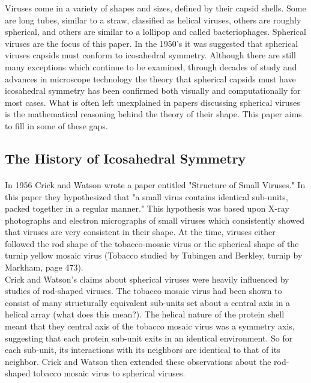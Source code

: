 \documentclass[12pt,letter]{article}
\begin{document}
Viruses come in a variety of shapes and sizes, defined by their capsid shells. Some are long tubes, similar to a straw, classified as helical viruses, others are roughly spherical, and others are similar to a lollipop and called bacteriophages. Spherical viruses are the focus of this paper. In the 1950's it was suggested that spherical viruses capsids must conform to icosahedral symmetry. Although there are still many exceptions which continue to be examined, through decades of study and advances in microscope technology the theory that spherical capsids must have icosahedral symmetry has been confirmed both visually and computationally for most cases. What is often left unexplained in papers discussing spherical viruses is the mathematical reasoning behind the theory of their shape. This paper aims to fill in some of these gaps.

\subsection{The History of Icosahedral Symmetry} %

\paragraph{}
In 1956 Crick and Watson wrote a paper entitled "Structure of Small Viruses." In this paper they hypothesized that "a small virus contains identical sub-units, packed together in a regular manner." This hypothesis was based upon X-ray photographs and electron micrographs of small viruses which consistently showed that viruses are very consistent in their shape. At the time, viruses either followed the rod shape of the tobacco-mosaic virus or the spherical shape of the turnip yellow mosaic virus (Tobacco studied by Tubingen and Berkley, turnip by Markham, page 473). \\

Crick and Watson's claims about spherical viruses were heavily influenced by studies of rod-shaped viruses. The tobacco mosaic virus had been shown to consist of many structurally equivalent sub-units set about a central axis in a helical array (what does this mean?). The helical nature of the protein shell meant that they central axis of the tobacco mosaic virus was a symmetry axis, suggesting that each protein sub-unit exits in an identical environment. So for each sub-unit, its interactions with its neighbors are identical to that of its neighbor. Crick and Watson then extended these observations about the rod-shaped tobacco mosaic virus to spherical viruses.
\end{document}
